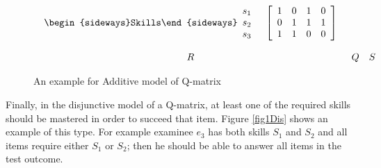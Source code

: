 \begin{figure}
\begin{footnotesize}
\[\begin{array}{ccc}
\begin{array}{cc}
\mathrm{\begin{sideways}Skills\end{sideways}}\begin{array}{c}
s_{1}\\
s_{2}\\
s_{3}
\end{array} & \left[\begin{array}{cccc}
1 & 0 & 1 & 0\\
0 & 1 & 1 & 1\\
1 & 1 & 0 & 0
\end{array}\right]
\end{array}\\
\\
R & Q & S
\end{array}
\]
 \end{footnotesize} \caption{An example for Additive model of Q-matrix}


\label{fig1Add} 
\end{figure}

Finally, in the disjunctive model of a Q-matrix, at least one of the required skills should be mastered in order to succeed that item. Figure \ref{fig1Dis} shows an example of this type. For example examinee $e_{3}$ has both skills $S_{1}$ and $S_{2}$ and all items require either $S_{1}$ or $S_{2}$; then he should be able to answer all items in the test outcome. 




